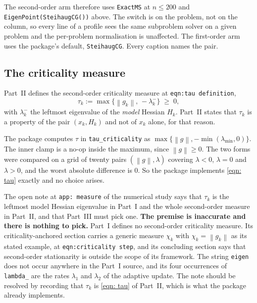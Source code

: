 \documentclass[11pt,a4paper]{article}
\providecommand{\defeq}{\mathrel{:=}}
\providecommand{\norm}[1]{\left \lVert #1 \right \rVert}
\theoremstyle{remark}
\begin{document}
The second-order arm therefore uses \texttt{ExactMS} at $n \leq 200$ and
\texttt{EigenPoint(SteihaugCG())} above. The switch is on the problem, not on the
column, so every line of a profile sees the same subproblem solver on a given
problem and the per-problem normalisation is unaffected. The first-order arm uses
the package's default, \texttt{SteihaugCG}. Every caption names the pair.

\subsection{The criticality measure}\label{sec: tau}

Part~II defines the second-order criticality measure at
\texttt{eqn:tau definition},
\begin{equation}
  \tau_k \defeq \max\{\norm{g_k},\, -\lambda_k^-\} \;\geq\; 0 ,
  \label{eqn: tau}
\end{equation}
with $\lambda_k^-$ the leftmost eigenvalue of the \emph{model} Hessian $H_k$.
Part~II states that $\tau_k$ is a property of the pair $(x_k, H_k)$ and not of
$x_k$ alone, for that reason.

The package computes $\tau$ in \texttt{tau\_criticality} as
$\max\{\norm{g}, -\min(\lambda_{\min}, 0)\}$. The inner clamp is a no-op inside
the maximum, since $\norm{g} \geq 0$. The two forms were compared on a grid of
twenty pairs $(\norm{g}, \lambda)$ covering $\lambda < 0$, $\lambda = 0$ and
$\lambda > 0$, and the worst absolute difference is $0$. So the package
implements \eqref{eqn: tau} exactly and no choice arises.

The open note at \texttt{app: measure} of the numerical study says that $\tau_k$
is the leftmost model Hessian eigenvalue in Part~I and the whole second-order
measure in Part~II, and that Part~III must pick one. \textbf{The premise is
inaccurate and there is nothing to pick.} Part~I defines no second-order
criticality measure. Its criticality-anchored section carries a generic measure
$\chi_k$ with $\chi_k = \norm{g_k}$ as its stated example, at
\texttt{eqn:criticality step}, and its concluding section says that second-order
stationarity is outside the scope of its framework. The string \texttt{eigen} does
not occur anywhere in the Part~I source, and its four occurrences of
\texttt{lambda\_} are the rates $\lambda_1$ and $\lambda_2$ of the adaptive
update. The note should be resolved by recording that $\tau_k$ is
\eqref{eqn: tau} of Part~II, which is what the package already implements.
\end{document}
